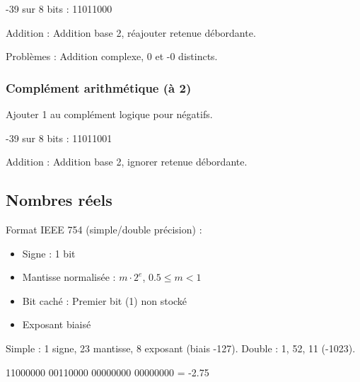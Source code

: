 \documentclass[12pt,a4paper]{article}
\begin{document}
\begin{exemple}
-39 sur 8 bits : 11011000
\end{exemple}

\begin{methode}
Addition : Addition base 2, réajouter retenue débordante.
\end{methode}

\begin{remarque}
Problèmes : Addition complexe, 0 et -0 distincts.
\end{remarque}

\subsubsection{Complément arithmétique (à 2)}
\begin{methode}
Ajouter 1 au complément logique pour négatifs.
\end{methode}

\begin{exemple}
-39 sur 8 bits : 11011001
\end{exemple}

\begin{methode}
Addition : Addition base 2, ignorer retenue débordante.
\end{methode}

\newpage
\subsection{Nombres réels}

\begin{definition}
Format IEEE 754 (simple/double précision) :
\begin{itemize}
    \item Signe : 1 bit
    \item Mantisse normalisée : $m \cdot 2^e$, $0.5 \leq m < 1$
    \item Bit caché : Premier bit (1) non stocké
    \item Exposant biaisé
\end{itemize}
\end{definition}

\begin{remarque}
Simple : 1 signe, 23 mantisse, 8 exposant (biais -127). Double : 1, 52, 11 (-1023).
\end{remarque}

\begin{exemple}
11000000 00110000 00000000 00000000 = -2.75
\end{exemple}
\end{document}
